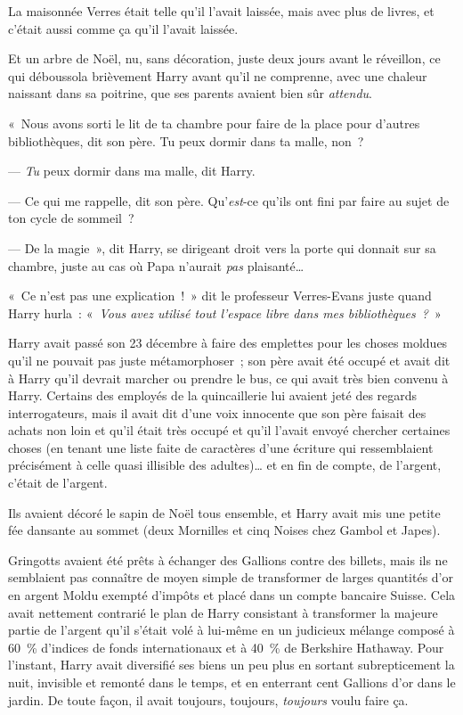 La maisonnée Verres était telle qu'il l'avait laissée, mais avec plus de livres, et c'était aussi comme ça qu'il l'avait laissée.

Et un arbre de Noël, nu, sans décoration, juste deux jours avant le réveillon, ce qui déboussola brièvement Harry avant qu'il ne comprenne, avec une chaleur naissant dans sa poitrine, que ses parents avaient bien sûr \emph{attendu}.

«~Nous avons sorti le lit de ta chambre pour faire de la place pour d'autres bibliothèques, dit son père. Tu peux dormir dans ta malle, non~?

--- \emph{Tu} peux dormir dans ma malle, dit Harry.

--- Ce qui me rappelle, dit son père. Qu'\emph{est}-ce qu'ils ont fini par faire au sujet de ton cycle de sommeil~?

--- De la magie~», dit Harry, se dirigeant droit vers la porte qui donnait sur sa chambre, juste au cas où Papa n'aurait \emph{pas} plaisanté…

«~Ce n'est pas une explication~!~» dit le professeur Verres-Evans juste quand Harry hurla~: «~\emph{Vous avez utilisé tout l'espace libre dans mes bibliothèques~?}~»

\later

Harry avait passé son 23 décembre à faire des emplettes pour les choses moldues qu'il ne pouvait pas juste métamorphoser~; son père avait été occupé et avait dit à Harry qu'il devrait marcher ou prendre le bus, ce qui avait très bien convenu à Harry. Certains des employés de la quincaillerie lui avaient jeté des regards interrogateurs, mais il avait dit d'une voix innocente que son père faisait des achats non loin et qu'il était très occupé et qu'il l'avait envoyé chercher certaines choses (en tenant une liste faite de caractères d'une écriture qui ressemblaient précisément à celle quasi illisible des adultes)… et en fin de compte, de l'argent, c'était de l'argent.

Ils avaient décoré le sapin de Noël tous ensemble, et Harry avait mis une petite fée dansante au sommet (deux Mornilles et cinq Noises chez Gambol et Japes).

Gringotts avaient été prêts à échanger des Gallions contre des billets, mais ils ne semblaient pas connaître de moyen simple de transformer de larges quantités d'or en argent Moldu exempté d'impôts et placé dans un compte bancaire Suisse. Cela avait nettement contrarié le plan de Harry consistant à transformer la majeure partie de l'argent qu'il s'était volé à lui-même en un judicieux mélange composé à 60~\% d'indices de fonds internationaux et à 40~\% de Berkshire Hathaway. Pour l'instant, Harry avait diversifié ses biens un peu plus en sortant subrepticement la nuit, invisible et remonté dans le temps, et en enterrant cent Gallions d'or dans le jardin. De toute façon, il avait toujours, toujours, \emph{toujours} voulu faire ça.

